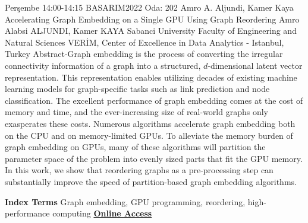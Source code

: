 
    \begin{abstract_basarim}
    {Perşembe 14:00-14:15}
    {BASARIM2022}
    {Oda: 202}
    {Amro A. Aljundi, Kamer Kaya}
    {Accelerating Graph Embedding on a Single GPU Using Graph Reordering}
    {%
    Amro Alabsi ALJUNDI, Kamer KAYA}
    {%
    }
    {%
    Sabanci University Faculty of Engineering and Natural Sciences \newline \noindent VERİM, Center of Excellence in Data Analytics - Istanbul, Turkey}
    Abstract-Graph embedding is the process of converting the irregular connectivity information of a graph into a structured, $d$-dimensional latent vector representation. This representation enables utilizing decades of existing machine learning models for graph-specific tasks such as link prediction and node classification. The excellent performance of graph embedding comes at the cost of memory and time, and the ever-increasing size of real-world graphs only exasperates these costs. Numerous algorithms accelerate graph embedding both on the CPU and on memory-limited GPUs. To alleviate the memory burden of graph embedding on GPUs, many of these algorithms will partition the parameter space of the problem into evenly sized parts that fit the GPU memory. In this work, we show that reordering graphs as a pre-processing step can substantially improve the speed of partition-based graph embedding algorithms. 
    
            \textbf{Index Terms} \newline{}Graph embedding, GPU programming, reordering, high-performance computing
     \newline\newline\noindent \href{https://drive.google.com/file/d/1mJKf5ZaYKOhfKoT0Dgo-n8cEwaoZl6r_/view?usp=drivesdk}{\bfseries Online Access}
    \end{abstract_basarim}
    